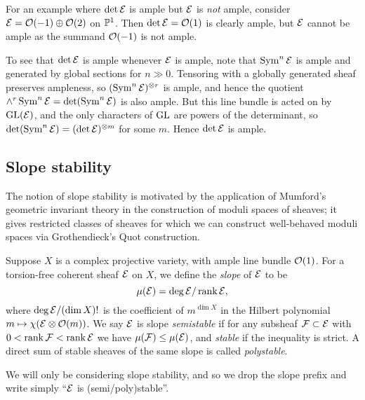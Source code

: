 \begin{example}
    For an example where $\det\calE$ is ample but $\calE$ is \emph{not} ample,
    consider $\calE=\O(-1)\oplus\O(2)$ on $\P^1$. Then $\det\calE=\O(1)$ is
    clearly ample, but $\calE$ cannot be ample as the summand $\O(-1)$ is not
    ample.
\end{example}

\begin{remark}
    To see that $\det\calE$ is ample whenever $\calE$ is ample, note that
    $\Sym^n\calE$ is ample and generated by global sections for $n\gg0$.
    Tensoring with a globally generated sheaf preserves ampleness, so
    $(\Sym^n\calE)^{\otimes r}$ is ample, and hence the quotient
    $\wedge^r\Sym^n\calE=\det(\Sym^n\calE)$ is also ample. But this line bundle
    is acted on by $\GL(\calE)$, and the only characters of $\GL$ are powers of
    the determinant, so $\det(\Sym^n\calE)=(\det\calE)^{\otimes m}$ for some
    $m$. Hence $\det\calE$ is ample.
\end{remark}

\subsection{Slope stability}

The notion of slope stability is motivated by the application of Mumford's
geometric invariant theory in the construction of moduli spaces of sheaves; it
gives restricted classes of sheaves for which we can construct well-behaved
moduli spaces via Grothendieck's Quot construction.

\begin{definition}
    Suppose $X$ is a complex projective variety, with ample line bundle $\O(1)$.
    For a torsion-free coherent sheaf $\calE$ on $X$, we define the \emph{slope}
    of $\calE$ to be
    \begin{equation*}
        \mu(\calE) = \deg\calE / \rank\calE,
    \end{equation*}
    where $\deg\calE/(\dim X)!$ is the coefficient of $m^{\dim X}$ in the
    Hilbert polynomial $m\mapsto\chi(\calE\otimes\O(m))$. We say $\calE$ is
    slope \emph{semistable} if for any subsheaf $\calF\subset\calE$ with
    $0<\rank\calF<\rank\calE$ we have $\mu(\calF)\le\mu(\calE)$, and
    \emph{stable} if the inequality is strict. A direct sum of stable sheaves of
    the same slope is called \emph{polystable}.
\end{definition}

We will only be considering slope stability, and so we drop the slope prefix and
write simply ``$\calE$ is (semi/poly)stable''. 

